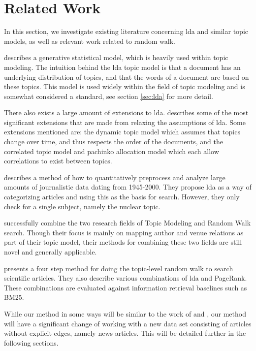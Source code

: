 \section{Related Work}\label{sec:related-works} 
In this section, we investigate existing literature concerning \gls{lda} and similar topic models, as well as relevant work related to random walk.

\citet{lda} describes a generative statistical model, which is heavily used within topic modeling. 
The intuition behind the \gls{lda} topic model is that a document has an underlying distribution of topics, and that the words of a document are based on these topics.
This model is used widely within the field of topic modeling and is somewhat considered a standard, see section \autoref{sec:lda} for more detail.

There also exists a large amount of extensions to \gls{lda}.
\citet{blei2012topicmodels} describes some of the most significant extensions that are made from relaxing the assumptions of \gls{lda}.
Some extensions mentioned are: the dynamic topic model\cite{blei2006dynamic} which assumes that topics change over time, and thus respects the order of the documents, and the correlated topic model\cite{blei2007correlated} and pachinko allocation model\cite{li2006pachinko} which each allow correlations to exist between topics.


\citet{quanti} describes a method of how to quantitatively preprocess and analyze large amounts of journalistic data dating from 1945-2000. 
They propose \gls{lda} as a way of categorizing articles and using this as the basis for search.
However, they only check for a single subject, namely the nuclear topic.  


\citet{Tang2008} successfully combine the two research fields of Topic Modeling and Random Walk search. 
Though their focus is mainly on mapping author and venue relations as part of their topic model, their methods for combining these two fields are still novel and generally applicable.


\citet{yang2009topic} presents a four step method for doing the topic-level random walk to search scientific articles. 
They also describe various combinations of \gls{lda} and PageRank.
These combinations are evaluated against information retrieval baselines such as BM25\cite{bm251996}.


While our method in some ways will be similar to the work of \citeauthor{Tang2008} and \citeauthor{yang2009topic}, our method will have a significant change of working with a new data set consisting of articles without explicit edges, namely news articles.
This will be detailed further in the following sections.

